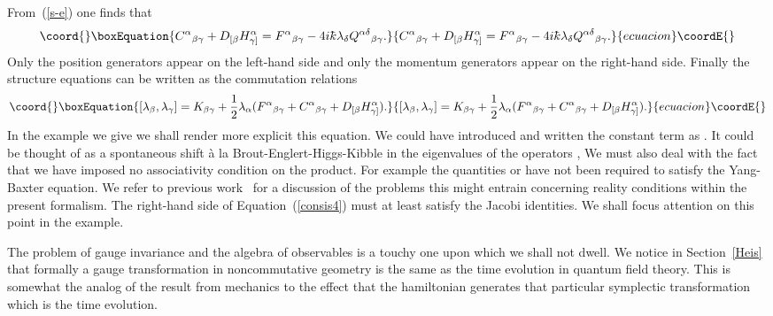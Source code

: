 \documentclass[12pt,a4paper]{article}
\newcounter{eg}
\def\kbar{{\mathchar'26\mkern-9muk}}
\begin{document}
From~(\ref{s-e}) one finds that
\begin{equation}\coord{}\boxEquation{
C^\alpha{}_{\beta \gamma} + D_{[\beta} H^\alpha_{\gamma]}
= F^\alpha{}_{\beta \gamma} -
4i\kbar \lambda_\delta Q^{\alpha\delta}{}_{\beta \gamma}.        \label{s-e2}
}{
C^\alpha{}_{\beta \gamma} + D_{[\beta} H^\alpha_{\gamma]}
= F^\alpha{}_{\beta \gamma} -
4i\kbar \lambda_\delta Q^{\alpha\delta}{}_{\beta \gamma}.        }{ecuacion}\coordE{}\end{equation}
Only the position generators \coordHE{} appear on the left-hand side
and only the momentum generators \myHighlight{$\lambda_\pm$}\coordHE{} appear on the
right-hand side. Finally the structure equations can be written as
the commutation relations
\begin{equation}\coord{}\boxEquation{
[\lambda_\beta, \lambda_\gamma] = K_{\beta\gamma}
+ \frac 12 \lambda_\alpha (F^\alpha{}_{\beta \gamma} +
C^\alpha{}_{\beta \gamma} + D_{[\beta} H^\alpha_{\gamma]}).   \label{consis4}
}{
[\lambda_\beta, \lambda_\gamma] = K_{\beta\gamma}
+ \frac 12 \lambda_\alpha (F^\alpha{}_{\beta \gamma} +
C^\alpha{}_{\beta \gamma} + D_{[\beta} H^\alpha_{\gamma]}).   }{ecuacion}\coordE{}\end{equation}
In the example we give we shall render more explicit this equation.
We could have introduced \coordHE{} and written the constant term
as \coordHE{}. It could be
thought of as a spontaneous shift \`a la Brout-Englert-Higgs-Kibble in
the eigenvalues of the operators \myHighlight{$\lambda_\alpha$}\coordHE{}, We must also deal
with the fact that we have imposed no associativity condition on the
product. For example the quantities \coordHE{}
or \coordHE{} have not been required to
satisfy the Yang-Baxter equation. We refer to previous
work~\cite{FioMad98a} for a discussion of the problems this might
entrain concerning reality conditions within the present formalism.
The right-hand side of Equation~(\ref{consis4}) must at least satisfy
the Jacobi identities.  We shall focus attention on this point in the
example.

The problem of gauge invariance and the algebra of observables is a
touchy one upon which we shall not dwell. We notice in
Section~\ref{Heis} that formally a gauge transformation in
noncommutative geometry is the same as the time evolution in quantum
field theory. This is somewhat the analog of the result from mechanics
to the effect that the hamiltonian generates that particular
symplectic transformation which is the time evolution.
\end{document}
